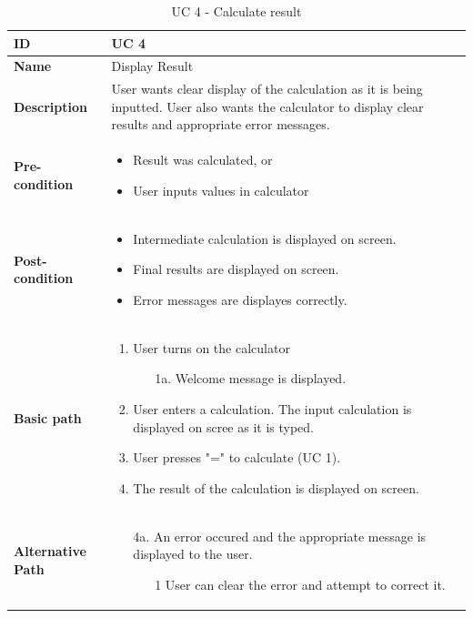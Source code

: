 \documentclass[a4paper, 12pt]{article}
\begin{document}
\begin{table}[!h]
\begin{tabular}{|p{3cm}|p{9cm}|}
\hline
\textbf{ID} & UC 4  \\ \hline
\textbf{Name} & Display Result  \\ \hline
\textbf{Description} & User wants clear display of the calculation as it is being inputted. User also wants the calculator to display clear results and appropriate error messages. \\ \hline
\textbf{Pre-condition} &
	\begin{itemize}
		\vspace{-2mm}
		\item Result was calculated, or
		\item User inputs values in calculator
		\vspace{-3.5mm}
	\end{itemize}  \\ \hline
\textbf{Post-condition} & 
	\begin{itemize}
		\vspace{-2mm}
		\item Intermediate calculation is displayed on screen.
		\item Final results are displayed on screen.
		\item Error messages are displayes correctly.
		\vspace{-3.5mm}
	\end{itemize}  \\ \hline
\textbf{Basic path} &
	\begin{enumerate}
		\vspace{-2mm}
		\item User turns on the calculator
			\begin{itemize}
			\item [1a.] Welcome message is displayed.
			\end{itemize}
		\item User enters a calculation. The input calculation is displayed on scree as it is typed.
		\item User presses "=" to calculate (UC 1).
		\item The result of the calculation is displayed on screen.
		\vspace{-3.5mm}
	\end{enumerate}  \\ \hline
\textbf{Alternative Path} &
	\begin{itemize}[leftmargin=6mm]
		\vspace{-2mm}
		\item [4a.] An error occured and the appropriate message is displayed to the user.
			\begin{itemize}
			\item [1] User can clear the error and attempt to correct it.
			\end{itemize}
		
		\vspace{-3.5mm}
	\end{itemize}  \\ \hline
\end{tabular}
\caption{UC 4 - Calculate result}
\end{table}

\pagebreak
\end{document}
